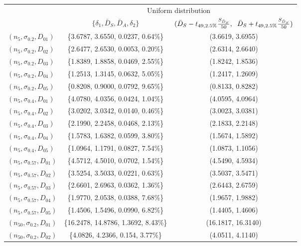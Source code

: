 \documentclass[preprint,12pt]{elsarticle}
\begin{document}
\begin{table} [h]
\begin{tabular}{|l|c c|}
\hline
&\multicolumn{2}{|c|}{Uniform distribution}\\
&$\{\delta_{1}, \bar{D}_{S}, \bar{D}_{A}, \delta_{2}\}$& $(\bar{D}_{S}-t_{49,2.5\%}\frac{S_{\bar{D}_{S}}}{50},\hspace{2mm}\bar{D}_{S}+t_{49,2.5\%}\frac{S_{\bar{D}_{S}}}{50})$ \\
\hline
$(n_{5},\sigma_{0.2},D_{01})$ &\{3.6787, 3.6550, 0.0237, 0.64\%\}&(3.6619, 3.6955) \\
$(n_{5},\sigma_{0.2},D_{02})$ &\{2.6477, 2.6530, 0.0053, 0.20\%\}&(2.6314, 2.6640) \\
$(n_{5},\sigma_{0.2},D_{03})$ &\{1.8389, 1.8858, 0.0469, 2.55\%\}&(1.8242, 1.8536) \\
$(n_{5},\sigma_{0.2},D_{04})$ &\{1.2513, 1.3145, 0.0632, 5.05\%\}&(1.2417, 1.2609) \\
$(n_{5},\sigma_{0.2},D_{05})$ &\{0.8208, 0.9000, 0.0792, 9.65\%\}&(0.8133, 0.8282) \\
$(n_{5},\sigma_{0.4},D_{01})$ &\{4.0780, 4.0356, 0.0424, 1.04\%\}&(4.0595, 4.0964) \\
$(n_{5},\sigma_{0.4},D_{02})$ &\{3.0202, 3.0342, 0.0140, 0.46\%\}&(3.0023, 3.0381) \\
$(n_{5},\sigma_{0.4},D_{03})$ &\{2.1990, 2.2458, 0.0468, 2.13\%\}&(2.1833, 2.2148) \\
$(n_{5},\sigma_{0.4},D_{04})$ &\{1.5783, 1.6382, 0.0599, 3.80\%\}&(1.5674, 1.5892) \\
$(n_{5},\sigma_{0.4},D_{05})$ &\{1.0964, 1.1791, 0.0827, 7.54\%\}&(1.0873, 1.1056) \\
$(n_{5},\sigma_{0.57},D_{01})$ &\{4.5712, 4.5010, 0.0702, 1.54\%\}&(4.5490, 4.5934) \\
$(n_{5},\sigma_{0.57},D_{02})$ &\{3.5254, 3.5033, 0.0221, 0.63\%\}&(3.5037, 3.5471) \\
$(n_{5},\sigma_{0.57},D_{03})$ &\{2.6601, 2.6963, 0.0362, 1.36\%\}&(2.6443, 2.6759)\\
$(n_{5},\sigma_{0.57},D_{04})$ &\{1.9770, 2.0538, 0.0388, 7.68\%\}&(1.9657, 1.9882)\\
$(n_{5},\sigma_{0.57},D_{05})$ &\{1.4506, 1.5496, 0.0990, 6.82\%\}&(1.4405, 1.4606)\\
$(n_{50},\sigma_{0.2},D_{01})$ &\{16.2478, 14.8786, 1.3692, 8.43\%\}&(16.1817, 16.3140)\\
$(n_{50},\sigma_{0.2},D_{02})$ &\{4.0826, 4.2366, 0.154, 3.77\%\}&(4.0511, 4.1140)\\

\end{tabular}
\end{table}
\end{document}
